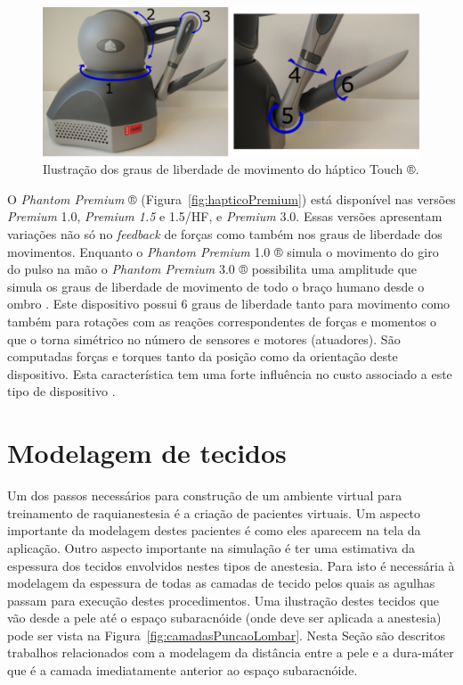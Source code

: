 \begin{figure}[ht!]
    \centering
    \includegraphics[width=0.5\linewidth]{capitulos/figuras/Haptico-Touch-DoF.png}
    \caption{Ilustração dos graus de liberdade de movimento do háptico Touch ®.}
    \label{fig:hapticoTouchDoFs}
\end{figure}

O \textit{Phantom Premium} ® (Figura~\ref{fig:hapticoPremium}) está disponível nas versões \textit{Premium} 1.0, \textit{Premium 1.5} e 1.5/HF, e \textit{Premium} 3.0. Essas versões apresentam variações não só no \textit{feedback} de forças como também nos graus de liberdade dos movimentos. Enquanto o \textit{Phantom Premium} 1.0 ® simula o movimento do giro do pulso na mão o \textit{Phantom Premium} 3.0 ® possibilita uma amplitude que simula os graus de liberdade de movimento de todo o braço humano desde o ombro \cite{3DSystems2018}. Este dispositivo possui 6 graus de liberdade tanto para movimento como também para rotações com as reações correspondentes de forças e momentos o que o torna simétrico no número de sensores e motores (atuadores). São computadas forças e torques tanto da posição como da orientação deste dispositivo. Esta característica tem uma forte influência no custo associado a este tipo de dispositivo \cite{Forsslund2013}.

\section{Modelagem de tecidos}
\label{sec:modelagemTecidos}

Um dos passos necessários para construção de um ambiente virtual para treinamento de raquianestesia é a criação de pacientes virtuais. Um aspecto importante da modelagem destes pacientes é como eles aparecem na tela da aplicação. Outro aspecto importante na simulação é ter uma estimativa da espessura dos tecidos envolvidos nestes tipos de anestesia. Para isto é necessária à modelagem da espessura de todas as camadas de tecido pelos quais as agulhas passam para execução destes procedimentos. Uma ilustração destes tecidos que vão desde a pele até o espaço subaracnóide (onde deve ser aplicada a anestesia) pode ser vista na Figura~\ref{fig:camadasPuncaoLombar}. Nesta Seção são descritos trabalhos relacionados com a modelagem da distância entre a pele e a dura-máter que é a camada imediatamente anterior ao espaço subaracnóide.


